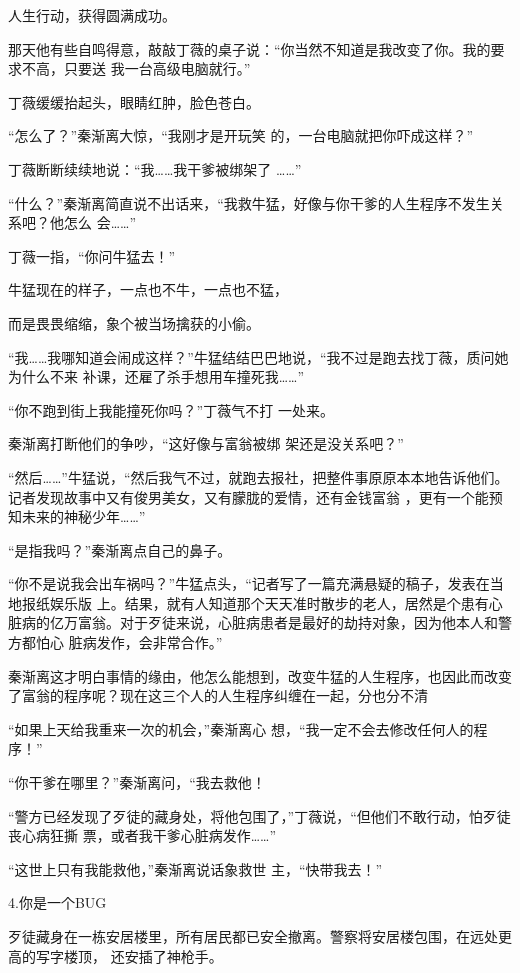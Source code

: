 \documentclass{article}
\begin{document}
人生行动，获得圆满成功。 

那天他有些自鸣得意，敲敲丁薇的桌子说：“你当然不知道是我改变了你。我的要求不高，只要送
我一台高级电脑就行。” 


丁薇缓缓抬起头，眼睛红肿，脸色苍白。 

“怎么了？”秦渐离大惊，“我刚才是开玩笑
的，一台电脑就把你吓成这样？” 

丁薇断断续续地说：“我……我干爹被绑架了
……” 

“什么？”秦渐离简直说不出话来，“我救牛猛，好像与你干爹的人生程序不发生关系吧？他怎么
会……” 


丁薇一指，“你问牛猛去！” 

牛猛现在的样子，一点也不牛，一点也不猛，
\newpage

而是畏畏缩缩，象个被当场擒获的小偷。 

“我……我哪知道会闹成这样？”牛猛结结巴巴地说，“我不过是跑去找丁薇，质问她为什么不来
补课，还雇了杀手想用车撞死我……” 

“你不跑到街上我能撞死你吗？”丁薇气不打
一处来。 

秦渐离打断他们的争吵，“这好像与富翁被绑
架还是没关系吧？” 

“然后……”牛猛说，“然后我气不过，就跑去报社，把整件事原原本本地告诉他们。记者发现故事中又有俊男美女，又有朦胧的爱情，还有金钱富翁
，更有一个能预知未来的神秘少年……” 


“是指我吗？”秦渐离点自己的鼻子。 

“你不是说我会出车祸吗？”牛猛点头，“记者写了一篇充满悬疑的稿子，发表在当地报纸娱乐版
\newpage
上。结果，就有人知道那个天天准时散步的老人，居然是个患有心脏病的亿万富翁。对于歹徒来说，心脏病患者是最好的劫持对象，因为他本人和警方都怕心
脏病发作，会非常合作。” 

秦渐离这才明白事情的缘由，他怎么能想到，改变牛猛的人生程序，也因此而改变了富翁的程序呢？现在这三个人的人生程序纠缠在一起，分也分不清

“如果上天给我重来一次的机会，”秦渐离心
想，“我一定不会去修改任何人的程序！” 

“你干爹在哪里？”秦渐离问，“我去救他！

“警方已经发现了歹徒的藏身处，将他包围了，”丁薇说，“但他们不敢行动，怕歹徒丧心病狂撕
票，或者我干爹心脏病发作……” 

“这世上只有我能救他，”秦渐离说话象救世
主，“快带我去！” 

\newpage


4.你是一个BUG 

歹徒藏身在一栋安居楼里，所有居民都已安全撤离。警察将安居楼包围，在远处更高的写字楼顶，
还安插了神枪手。 
\end{document}
